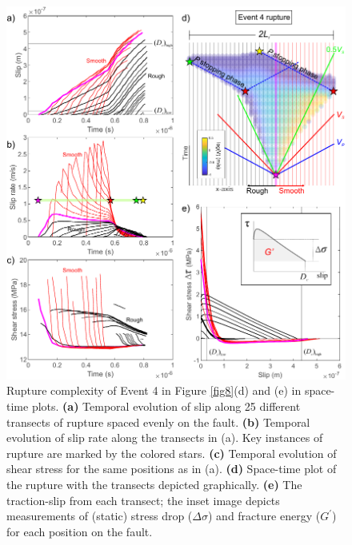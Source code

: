 \documentclass[preprint,1p, 10pt,authoryear]{elsarticle}
\begin{document}
\begin{figure}
	\centering
	\includegraphics{FIG9_revised.pdf} 
	\caption{Rupture complexity of Event 4 in Figure \ref{fig8}(d) and (e) in space-time plots.  \textbf{(a)} Temporal evolution of slip along 25 different transects of rupture spaced evenly on the fault. \textbf{(b)} Temporal evolution of slip rate along the transects in (a). Key instances of rupture are marked by the colored stars. \textbf{(c)} Temporal evolution of shear stress for the same positions as in (a). \textbf{(d)} Space-time plot of the rupture with the transects depicted graphically. \textbf{(e)} The traction-slip from each transect; the inset image depicts measurements of (static) stress drop ($\Delta\sigma$) and fracture energy ($G^{'}$) for each position on the fault.}
	\label{fig9}
\end{figure}
\end{document}
